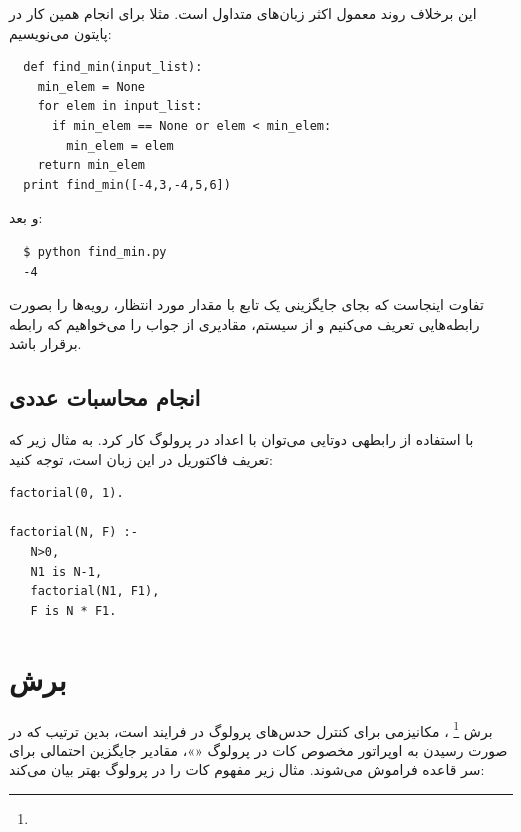 \documentclass{article}
\begin{document}
\clearpage
\noindent این برخلاف روند معمول اکثر زبان‌های متداول است. مثلا برای انجام همین کار در پایتون
می‌نویسیم:

\begin{verbatim}
  def find_min(input_list):
    min_elem = None
    for elem in input_list:
      if min_elem == None or elem < min_elem:
        min_elem = elem
    return min_elem
  print find_min([-4,3,-4,5,6])
\end{verbatim}
و بعد:
\begin{verbatim}
  $ python find_min.py
  -4
\end{verbatim}
تفاوت اینجاست که بجای جایگزینی یک تابع با مقدار مورد انتظار،
رویه‌ها را بصورت رابطه‌هایی تعریف می‌کنیم و از سیستم، مقادیری از جواب را می‌خواهیم
که رابطه برقرار باشد.
\clearpage
\subsection{انجام محاسبات عددی}
با استفاده از رابطهی دوتایی  می‌توان با اعداد در پرولوگ کار کرد.
به مثال زیر که تعریف فاکتوریل در این زبان است، توجه کنید:
\begin{verbatim}
factorial(0, 1).

factorial(N, F) :-
   N>0,
   N1 is N-1,
   factorial(N1, F1),
   F is N * F1.
\end{verbatim}

\clearpage
\section{برش}
برش
\footnote{}
، مکانیزمی برای کنترل حدس‌های پرولوگ در فرایند  است، بدین ترتیب که
در صورت رسیدن به اوپراتور مخصوص کات در پرولوگ «\lr{\tt !}»، مقادیر جایگزین احتمالی
برای سر قاعده فراموش می‌شوند.
مثال زیر مفهوم کات را در پرولوگ بهتر بیان می‌کند:
\end{document}
